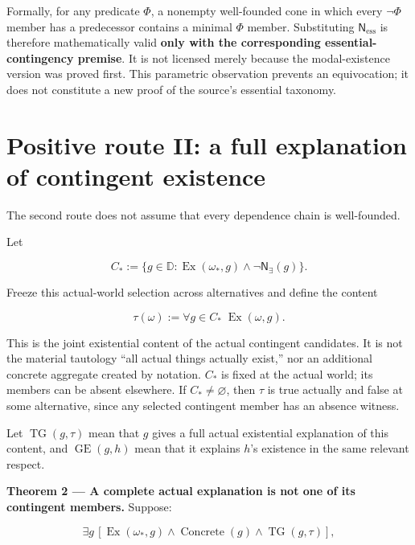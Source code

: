 \documentclass[11pt,a4paper]{article}
\begin{document}
Formally, for any predicate \(\Phi\), a nonempty well-founded cone in
which every \(\neg\Phi\) member has a predecessor contains a minimal
\(\Phi\) member. Substituting \(\mathsf N_{\mathrm{ess}}\) is therefore
mathematically valid \textbf{only with the corresponding
essential-contingency premise}. It is not licensed merely because the
modal-existence version was proved first. This parametric observation
prevents an equivocation; it does not constitute a new proof of the
source's essential taxonomy.

\section{Positive route II: a full explanation of contingent
existence}\label{positive-route-ii-a-full-explanation-of-contingent-existence}

The second route does not assume that every dependence chain is
well-founded.

Let

\nopagebreak[4]

\[
C_*:=\{g\in\mathbb D:\operatorname{Ex}(\omega_*,g)
                         \land\neg\mathsf N_{\exists}(g)\}.
\]

Freeze this actual-world selection across alternatives and define the
content

\nopagebreak[4]

\[
\tau(\omega):=\forall g\in C_*\;\operatorname{Ex}(\omega,g).
\]

This is the joint existential content of the actual contingent
candidates. It is not the material tautology ``all actual things
actually exist,'' nor an additional concrete aggregate created by
notation. \(C_*\) is fixed at the actual world; its members can be
absent elsewhere. If \(C_*\ne\varnothing\), then \(\tau\) is true
actually and false at some alternative, since any selected contingent
member has an absence witness.

Let \(\operatorname{TG}(g,\tau)\) mean that \(g\) gives a full actual
existential explanation of this content, and \(\operatorname{GE}(g,h)\)
mean that it explains \(h\)'s existence in the same relevant respect.


\textbf{Theorem 2 --- A complete actual explanation is not one of its
contingent members.} Suppose:

\nopagebreak[4]

\[
\exists g\,[\operatorname{Ex}(\omega_*,g)\land
                 \operatorname{Concrete}(g)\land\operatorname{TG}(g,\tau)],
\]
\end{document}
